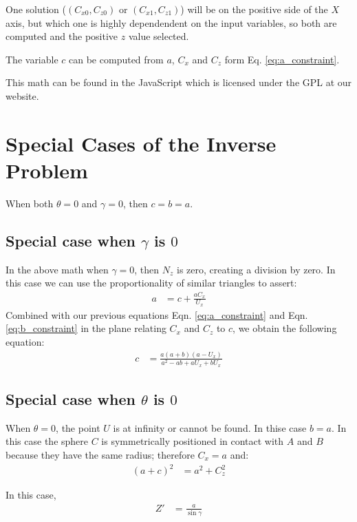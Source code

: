 \documentclass{article}
\begin{document}
One solution ($(C_{x0},C_{z0})$ or $(C_{x1},C_{z1})$) will be on the
positive side of the $X$ axis, but which one is highly dependendent
on the input variables, so both are computed and the positive $z$
value selected.

The variable $c$ can be computed from $a$, $C_x$ and $C_z$
form Eq. \ref{eq:a_constraint}.

This math can be found in the JavaScript which is licensed
under the GPL\cite{gplv3} at our website\cite{softrobotcalc}.

\section{Special Cases of the Inverse Problem}

When both $\theta = 0$ and $\gamma = 0$, then $c = b = a$.

\subsection{Special case when $\gamma$ is $0$ }

In the above math when $\gamma = 0$, then $N_z$ is zero,
creating a division by zero.
In this case we can use the proportionality of similar
triangles to assert:
\begin{align}
  a &= c + \frac{a C_x}{U_x}
\end{align}
Combined with our previous equations
Eqn. \ref{eq:a_constraint} and Eqn. \ref{eq:b_constraint} in the plane
relating $C_x$ and $C_z$ to $c$,
we obtain the following equation:
\begin{align}
c & = \frac{a (a + b) (a - U_x)}{a^2 - a b + a U_x + b U_x}
\end{align}


\subsection{Special case when $\theta$ is $0$ }

When $\theta = 0$, the point $U$ is at infinity or
cannot be found. In thise case $b = a$.
In this case the sphere $C$ is symmetrically
positioned in contact with $A$ and $B$ because
they have the same radius; therefore $C_x = a$ and:
\begin{align}
(a + c)^2 &= a^2 + C_z^2
\end{align}

In this case,
\begin{align}
Z' &= \frac{a}{\sin{\gamma}}
\end{align}
\end{document}
